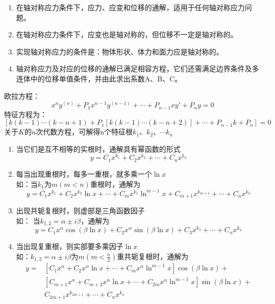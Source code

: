 \begin{enumerate}
\item 在轴对称应力条件下，应力、应变和位移的通解，适用于任何轴对称应力问题。
\item 在轴对称应力条件下，应变也是轴对称的，但位移不一定是轴对称的。
\item 实现轴对称应力的条件是：物体形状、体力和面力应是轴对称的。
\item 轴对称应力及对应的位移的通解已满足相容方程，它们还需满足边界条件及多连体中的位移单值条件，并由此求出系数A、B、C。
\end{enumerate}
\begin{note}
欧拉方程：
\[x^ny^{\left( n \right)}+P_1x^{n-1}y^{\left( n-1 \right)}+\cdots +P_{n-1}xy'+P_ny=0\]
特征方程为：
\[\left[ k\left( k-1 \right) \cdots \left( k-n+1 \right) +P_1\left[ k\left( k-1 \right) \cdots \left( k-n+2 \right) \right] +\cdots +P_{n-1}k+P_n \right] =0\]
关于$K$的$n$次代数方程，可解得n个特征根$k_1\text{、}k_2\text{、}\cdots k_n$
\begin{enumerate}
\item 当它们是互不相等的实根时，通解具有幂函数的形式
\[y=C_1x^{k_1}+C_2x^{k_2}+\cdots +C_nx^{k_n}\]
\item 每当出现重根时，每多一重根，就多乘一个$\ln x$\\
如：当$k_1$为$m\left( m<n \right) $重根时，通解为
\[y=C_1x^{k_1}+C_2x^{k_2}\ln x+\cdots +C_mx^{k_1}\ln ^{m-1}x+C_{m+1}x^{k_{m+1}}+\cdots +C_nx^{k_n}\]
\item 出现共轭复根时，则虚部是三角函数因子\\
如： 当$k_{1,2}=\alpha \pm i\beta $，通解为
\[y=C_1x^{\alpha}\cos \left( \beta \ln x \right) +C_2x^{\alpha}\sin \left( \beta \ln x \right) +C_3x^{k_3}+\cdots +C_nx^{k_n}\]
\item 当出现复重根，则实部要多乘因子$\ln x$\\
如：$k_{1,2}=\alpha \pm i\beta $为$m\left( m<\frac{n}{2} \right) $重共轭复根时，通解为
\begin{align*}
	y
	= & \left[ C_1x^{\alpha}+C_2x^{\alpha}\ln x+\cdots +C_mx^{\alpha}\ln ^{m-1}x \right] \cos \left( \beta \ln x \right) +\\
	&\left[ C_{m+1}x^{\alpha}+C_{m+2}x^{\alpha}\ln x+\cdots +C_{2m}x^{\alpha}\ln ^{m-1}x \right] \sin \left( \beta \ln x \right) +\\
	&C_{2m+1}x^{k_{2m+1}}+\cdots +C_nx^{k_n}
\end{align*}
\end{enumerate}
\end{note}

